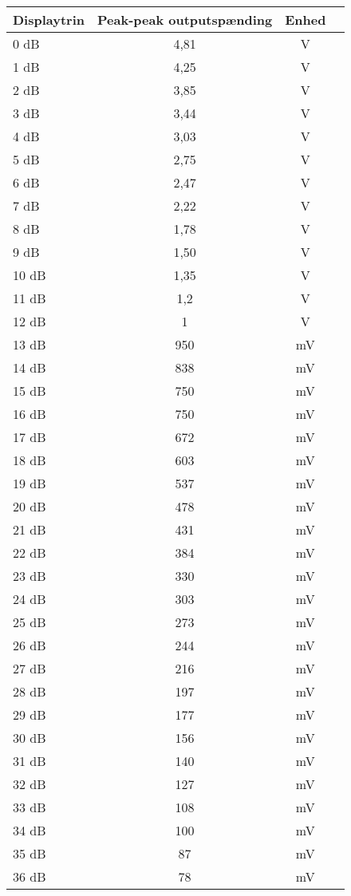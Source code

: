 \begin{table}[h]
\centering
\begin{tabular}{l|c|c|l}
\hline\hline
Displaytrin & Peak-peak outputspænding & Enhed \\
\hline\hline
0 dB & 4,81 & V \\[4pt]
1 dB & 4,25 & V \\[4pt]
2 dB & 3,85 & V \\[4pt]
3 dB & 3,44 & V \\[4pt]
4 dB & 3,03 & V \\[4pt]
5 dB & 2,75 & V \\[4pt]
6 dB & 2,47 & V \\[4pt]
7 dB & 2,22 & V \\[4pt]
8 dB & 1,78 & V \\[4pt]
9 dB & 1,50 & V \\[4pt]
10 dB & 1,35 & V \\[4pt]
11 dB & 1,2 & V \\[4pt]
12 dB & 1 & V \\[4pt]
13 dB & 950 & mV \\[4pt]
14 dB & 838 & mV \\[4pt]
15 dB & 750 & mV \\[4pt]
16 dB & 750 & mV \\[4pt]
17 dB & 672 & mV \\[4pt]
18 dB & 603 & mV \\[4pt]
19 dB & 537 & mV \\[4pt]
20 dB & 478 & mV \\[4pt]
21 dB & 431 & mV \\[4pt]
22 dB & 384 & mV \\[4pt]
23 dB & 330 & mV \\[4pt]
24 dB & 303 & mV \\[4pt]
25 dB & 273 & mV \\[4pt]
26 dB & 244 & mV \\[4pt]
27 dB & 216 & mV \\[4pt]
28 dB & 197 & mV \\[4pt]
29 dB & 177 & mV \\[4pt]
30 dB & 156 & mV \\[4pt]
31 dB & 140 & mV \\[4pt]
32 dB & 127 & mV \\[4pt]
33 dB & 108 & mV \\[4pt]
34 dB & 100 & mV \\[4pt]
35 dB & 87 & mV \\[4pt]
36 dB & 78 & mV \\[4pt]

\end{tabular}
\end{table}
